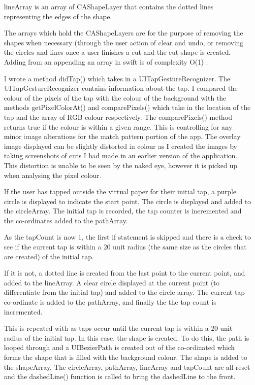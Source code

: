 \documentclass[11pt]{article}
\begin{document}
                 lineArray is an array of CAShapeLayer that contains the dotted lines representing the edges of the shape.
                 
                 The arrays which hold the CAShapeLayers are for the purpose of removing the shapes when necessary (through the user action of clear and undo, or removing the circles and lines once a user finishes a cut and the cut shape is created. Adding from an appending an array in swift is of complexity O(1) \cite{O1}. 
                 
                 I wrote a method didTap() which takes in a UITapGestureRecognizer. The UITapGestureRecognizer contains information about the tap. I compared the colour of the pixels of the tap with the colour of the background with the methods getPixelColorAt() and comparePixels() which take in the location of the tap and the array of RGB colour respectively. The comparePixels() method returns true if the colour is within a given range. This is controlling for any minor image alterations for the match pattern portion of the app. The overlay image displayed can be slightly distorted in colour as I created the images by taking screenshots of cuts I had made in an earlier version of the application. This distortion is unable to be seen by the naked eye, however it is picked up when analysing the pixel colour. 
                 
                 If the user has tapped outside the virtual paper for their initial tap, a purple circle is displayed to indicate the start point. The circle is displayed and added to the circleArray. The initial tap is recorded, the tap counter is incremented and the co-ordinates added to the pathArray. 
                 
                 As the tapCount is now 1, the first if statement is skipped and there is a check to see if the current tap is within a 20 unit radius (the same size as the circles that are created) of the initial tap. 
                 
                 If it is not, a dotted line is created from the last point to the current point, and added to the lineArray. A clear circle displayed at the current point (to differentiate from the initial tap) and added to the circle array. The current tap co-ordinate is added to the pathArray, and finally the the tap count is incremented.
                 
                 This is repeated with as taps occur until the current tap is within a 20 unit radius of the initial tap. In this case, the shape is created. To do this, the path is looped through and a UIBezierPath is created out of the co-ordinated which forms the shape that is filled with the background colour. The shape is added to the shapeArray. The circleArray, pathArray, lineArray and tapCount are all reset and the dashedLine() function is called to bring the dashedLine to the front. 
\end{document}
